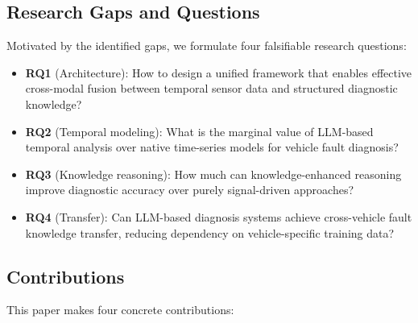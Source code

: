 \documentclass[11pt,a4paper]{article}
\begin{document}
\subsection{Research Gaps and Questions}\label{sec:rq}

Motivated by the identified gaps, we formulate four falsifiable research questions:

\begin{itemize}[leftmargin=1.5em]
    \item \textbf{RQ1} (Architecture): How to design a unified framework that enables effective cross-modal fusion between temporal sensor data and structured diagnostic knowledge?
    \item \textbf{RQ2} (Temporal modeling): What is the marginal value of LLM-based temporal analysis over native time-series models for vehicle fault diagnosis?
    \item \textbf{RQ3} (Knowledge reasoning): How much can knowledge-enhanced reasoning improve diagnostic accuracy over purely signal-driven approaches?
    \item \textbf{RQ4} (Transfer): Can LLM-based diagnosis systems achieve cross-vehicle fault knowledge transfer, reducing dependency on vehicle-specific training data?
\end{itemize}

\subsection{Contributions}\label{sec:contributions}

This paper makes four concrete contributions:
\end{document}
